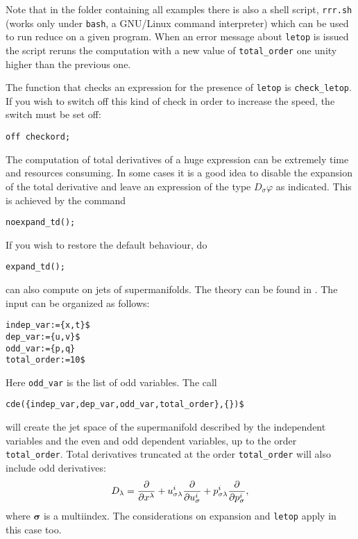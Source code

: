 Note that in the folder containing all examples there is also a shell script,
\texttt{rrr.sh} (works only under \texttt{bash}, a GNU/Linux command
interpreter) which can be used to run reduce on a given \cde program.
When an error message about \texttt{letop} is issued the script
reruns the computation with a new value of \texttt{total\_order} one unity
higher than the previous one.

\hypertarget{switch:CHECKORD}{}
The function that checks an expression for the presence of \texttt{letop} is
\texttt{check\_letop}.  If you wish to switch off this kind of check in order
to increase the speed, the switch
 must be set off:
\begin{verbatim}
off checkord;
\end{verbatim}

The computation of total derivatives of a huge expression can be extremely time
and resources consuming. In some cases it is a good idea to disable the
expansion of the total derivative and leave an expression of the type $D_\sigma
\varphi$ as indicated. This is achieved by the command
\begin{verbatim}
noexpand_td();
\end{verbatim}
If you wish to restore the default behaviour, do
\begin{verbatim}
expand_td();
\end{verbatim}

\cde can also compute on jets of supermanifolds. The theory can be found in
\cite{IgoninVerbovetskyVitolo:2004,KerstenKrasilshchikVerboretsky:2004,KrasilshchikVerbovetsky:JGP:2011}. The input can be organized as follows:
\begin{verbatim}
indep_var:={x,t}$
dep_var:={u,v}$
odd_var:={p,q}
total_order:=10$
\end{verbatim}
Here \texttt{odd\_var} is the list of odd variables. The call
\begin{verbatim}
cde({indep_var,dep_var,odd_var,total_order},{})$
\end{verbatim}
will create the jet space of the supermanifold described by the independent
variables and the even and odd dependent variables, up to the order
\texttt{total\_order}. Total derivatives truncated at the order
\texttt{total\_order} will also include odd derivatives:
\begin{equation}
  D_\lambda=\pd{}{x^\lambda} +
  u^i_{\mathbf{\sigma}\lambda}\pd{}{u^i_{\mathbf{\sigma}}}
    + p^i_{\mathbf{\sigma}\lambda}\pd{}{p^i_{\mathbf{\sigma}}},
\end{equation}
where $\mathbf{\sigma}$ is a multiindex. The considerations on
expansion and \texttt{letop} apply in this case too.

